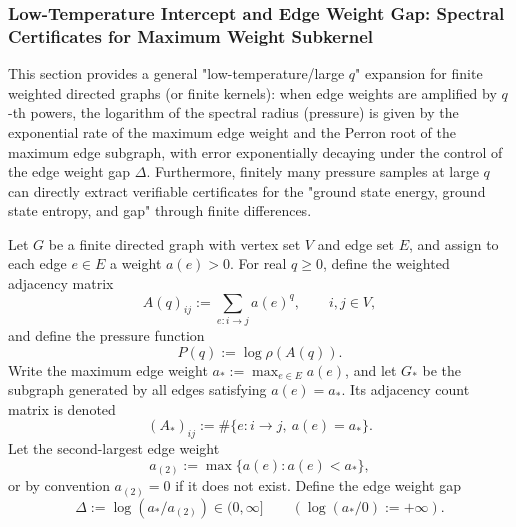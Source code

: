 \subsubsection{Low-Temperature Intercept and Edge Weight Gap: Spectral Certificates for Maximum Weight Subkernel}\label{subsubsec:pom-low-temperature-maxedge-gap}
This section provides a general "low-temperature/large \(q\)" expansion for finite weighted directed graphs (or finite kernels): when edge weights are amplified by \(q\)-th powers, the logarithm of the spectral radius (pressure) is given by the exponential rate of the maximum edge weight and the Perron root of the maximum edge subgraph, with error exponentially decaying under the control of the edge weight gap \(\Delta\).
Furthermore, finitely many pressure samples at large \(q\) can directly extract verifiable certificates for the "ground state energy, ground state entropy, and gap" through finite differences.

\begin{definition}\label{def:pom-low-temperature-weighted-adjacency}
Let \(G\) be a finite directed graph with vertex set \(V\) and edge set \(E\), and assign to each edge \(e\in E\) a weight \(a(e)>0\).
For real \(q\ge 0\), define the weighted adjacency matrix
\[
A(q)_{ij}:=\sum_{e:i\to j} a(e)^{q},
\qquad i,j\in V,
\]
and define the pressure function
\[
P(q):=\log\rho(A(q)).
\]
Write the maximum edge weight \(a_*:=\max_{e\in E}a(e)\), and let \(G_*\) be the subgraph generated by all edges satisfying \(a(e)=a_*\).
Its adjacency count matrix is denoted
\[
(A_*)_{ij}:=\#\{e:i\to j,\ a(e)=a_*\}.
\]
Let the second-largest edge weight
\[
a_{(2)}:=\max\{a(e):a(e)<a_*\},
\]
or by convention \(a_{(2)}=0\) if it does not exist.
Define the edge weight gap
\[
\Delta:=\log(a_*/a_{(2)})\in(0,\infty]\qquad(\log(a_*/0):=+\infty).
\]
\end{definition}

